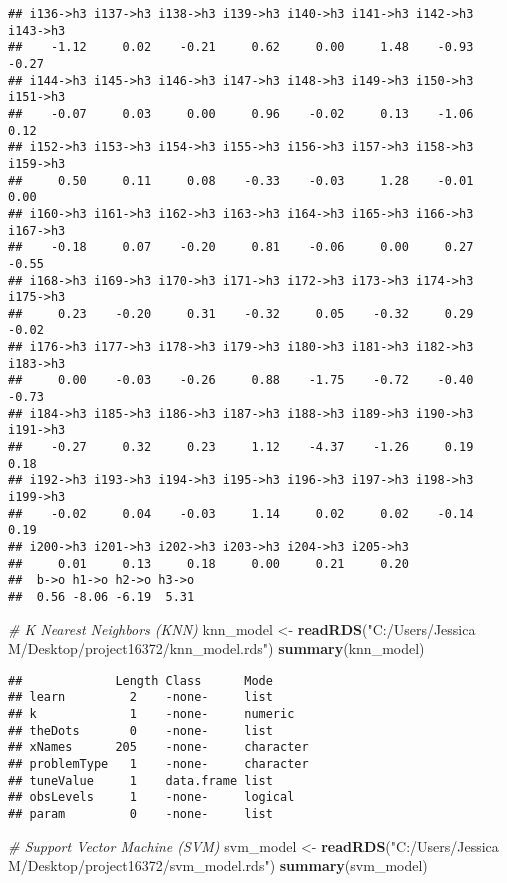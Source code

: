 \documentclass[
]{article}
\newenvironment{Shaded}{\begin{snugshade}}{\end{snugshade}}
\newcommand{\CommentTok}[1]{\textcolor[rgb]{0.56,0.35,0.01}{\textit{#1}}}
\newcommand{\FunctionTok}[1]{\textcolor[rgb]{0.13,0.29,0.53}{\textbf{#1}}}
\newcommand{\NormalTok}[1]{#1}
\newcommand{\OtherTok}[1]{\textcolor[rgb]{0.56,0.35,0.01}{#1}}
\newcommand{\StringTok}[1]{\textcolor[rgb]{0.31,0.60,0.02}{#1}}
\begin{document}
\begin{verbatim}
## i136->h3 i137->h3 i138->h3 i139->h3 i140->h3 i141->h3 i142->h3 i143->h3 
##    -1.12     0.02    -0.21     0.62     0.00     1.48    -0.93    -0.27 
## i144->h3 i145->h3 i146->h3 i147->h3 i148->h3 i149->h3 i150->h3 i151->h3 
##    -0.07     0.03     0.00     0.96    -0.02     0.13    -1.06     0.12 
## i152->h3 i153->h3 i154->h3 i155->h3 i156->h3 i157->h3 i158->h3 i159->h3 
##     0.50     0.11     0.08    -0.33    -0.03     1.28    -0.01     0.00 
## i160->h3 i161->h3 i162->h3 i163->h3 i164->h3 i165->h3 i166->h3 i167->h3 
##    -0.18     0.07    -0.20     0.81    -0.06     0.00     0.27    -0.55 
## i168->h3 i169->h3 i170->h3 i171->h3 i172->h3 i173->h3 i174->h3 i175->h3 
##     0.23    -0.20     0.31    -0.32     0.05    -0.32     0.29    -0.02 
## i176->h3 i177->h3 i178->h3 i179->h3 i180->h3 i181->h3 i182->h3 i183->h3 
##     0.00    -0.03    -0.26     0.88    -1.75    -0.72    -0.40    -0.73 
## i184->h3 i185->h3 i186->h3 i187->h3 i188->h3 i189->h3 i190->h3 i191->h3 
##    -0.27     0.32     0.23     1.12    -4.37    -1.26     0.19     0.18 
## i192->h3 i193->h3 i194->h3 i195->h3 i196->h3 i197->h3 i198->h3 i199->h3 
##    -0.02     0.04    -0.03     1.14     0.02     0.02    -0.14     0.19 
## i200->h3 i201->h3 i202->h3 i203->h3 i204->h3 i205->h3 
##     0.01     0.13     0.18     0.00     0.21     0.20 
##  b->o h1->o h2->o h3->o 
##  0.56 -8.06 -6.19  5.31
\end{verbatim}

\begin{Shaded}
\begin{Highlighting}[]
\CommentTok{\# K Nearest Neighbors (KNN)}
\NormalTok{knn\_model }\OtherTok{\textless{}{-}} \FunctionTok{readRDS}\NormalTok{(}\StringTok{"C:/Users/Jessica M/Desktop/project16372/knn\_model.rds"}\NormalTok{)}
\FunctionTok{summary}\NormalTok{(knn\_model)}
\end{Highlighting}
\end{Shaded}

\begin{verbatim}
##             Length Class      Mode     
## learn         2    -none-     list     
## k             1    -none-     numeric  
## theDots       0    -none-     list     
## xNames      205    -none-     character
## problemType   1    -none-     character
## tuneValue     1    data.frame list     
## obsLevels     1    -none-     logical  
## param         0    -none-     list
\end{verbatim}

\begin{Shaded}
\begin{Highlighting}[]
\CommentTok{\# Support Vector Machine (SVM)}
\NormalTok{svm\_model }\OtherTok{\textless{}{-}} \FunctionTok{readRDS}\NormalTok{(}\StringTok{"C:/Users/Jessica M/Desktop/project16372/svm\_model.rds"}\NormalTok{)}
\FunctionTok{summary}\NormalTok{(svm\_model)}
\end{Highlighting}
\end{Shaded}
\end{document}

